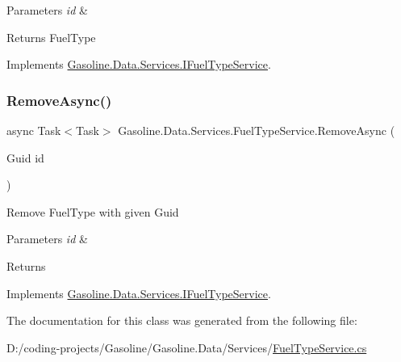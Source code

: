 \begin{DoxyParams}{Parameters}
{\em id} & \\
\hline
\end{DoxyParams}
\begin{DoxyReturn}{Returns}
Fuel\+Type
\end{DoxyReturn}


Implements \mbox{\hyperlink{interface_gasoline_1_1_data_1_1_services_1_1_i_fuel_type_service_a3abc3e8b5c004ce0da2645017c971114}{Gasoline.\+Data.\+Services.\+I\+Fuel\+Type\+Service}}.

\mbox{\label{class_gasoline_1_1_data_1_1_services_1_1_fuel_type_service_a304619cc0643282249d7ce2619340eee}} 
\subsubsection{\texorpdfstring{RemoveAsync()}{RemoveAsync()}}
{\footnotesize\ttfamily async Task$<$Task$>$ Gasoline.\+Data.\+Services.\+Fuel\+Type\+Service.\+Remove\+Async (\begin{DoxyParamCaption}\item[{Guid}]{id }\end{DoxyParamCaption})}



Remove Fuel\+Type with given Guid 


\begin{DoxyParams}{Parameters}
{\em id} & \\
\hline
\end{DoxyParams}
\begin{DoxyReturn}{Returns}

\end{DoxyReturn}


Implements \mbox{\hyperlink{interface_gasoline_1_1_data_1_1_services_1_1_i_fuel_type_service_adf2b22c96b7badbb188a3399eef01b0d}{Gasoline.\+Data.\+Services.\+I\+Fuel\+Type\+Service}}.



The documentation for this class was generated from the following file\+:\begin{DoxyCompactItemize}
\item 
D\+:/coding-\/projects/\+Gasoline/\+Gasoline.\+Data/\+Services/\mbox{\hyperlink{_fuel_type_service_8cs}{Fuel\+Type\+Service.\+cs}}\end{DoxyCompactItemize}

